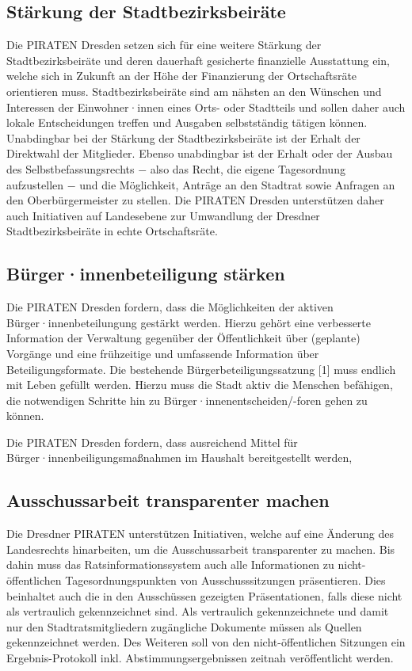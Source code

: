 \documentclass[a4paper, 11pt]{article}
\begin{document}
\subsection{Stärkung der Stadtbezirksbeiräte}
Die PIRATEN Dresden setzen sich für eine weitere Stärkung der Stadtbezirksbeiräte und deren dauerhaft gesicherte finanzielle Ausstattung ein, welche sich in Zukunft an der Höhe der Finanzierung der Ortschaftsräte orientieren muss. Stadtbezirksbeiräte sind am nähsten an den Wünschen und Interessen der Einwohner·innen eines Orts- oder Stadtteils und sollen daher auch lokale Entscheidungen treffen und Ausgaben selbstständig tätigen können. Unabdingbar bei der Stärkung der Stadtbezirksbeiräte ist der Erhalt der Direktwahl der Mitglieder. Ebenso unabdingbar ist der Erhalt oder der Ausbau des Selbstbefassungsrechts $-$ also das Recht, die eigene Tagesordnung aufzustellen $-$ und die Möglichkeit, Anträge an den Stadtrat sowie Anfragen an den Oberbürgermeister zu stellen. Die PIRATEN Dresden unterstützen daher auch Initiativen auf Landesebene zur Umwandlung der Dresdner Stadtbezirksbeiräte in echte Ortschaftsräte.


\subsection{Bürger·innenbeteiligung stärken}
Die PIRATEN Dresden fordern, dass die Möglichkeiten der aktiven Bürger·innenbeteilungung gestärkt werden. Hierzu gehört eine verbesserte Information der Verwaltung gegenüber der Öffentlichkeit über (geplante) Vorgänge und eine frühzeitige und umfassende Information über Beteiligungsformate. Die bestehende Bürgerbeteiligungssatzung [1] muss endlich mit Leben gefüllt werden. Hierzu muss die Stadt aktiv die Menschen befähigen, die notwendigen Schritte hin zu Bürger·innenentscheiden/-foren gehen zu können.\newline

Die PIRATEN Dresden fordern, dass ausreichend Mittel für Bürger·innenbeiligungsmaßnahmen im Haushalt bereitgestellt werden,


\subsection{Ausschussarbeit transparenter machen}
Die Dresdner PIRATEN unterstützen Initiativen, welche auf eine Änderung des Landesrechts hinarbeiten, um die Ausschussarbeit transparenter zu machen. Bis dahin muss das Ratsinformationssystem auch alle Informationen zu nicht-öffentlichen Tagesordnungspunkten von Ausschusssitzungen präsentieren. Dies beinhaltet auch die in den Ausschüssen gezeigten Präsentationen, falls diese nicht als vertraulich gekennzeichnet sind. Als vertraulich gekennzeichnete und damit nur den Stadtratsmitgliedern zugängliche Dokumente müssen als Quellen gekennzeichnet werden. Des Weiteren soll von den nicht-öffentlichen Sitzungen ein Ergebnis-Protokoll inkl. Abstimmungsergebnissen zeitnah veröffentlicht werden.
\end{document}
